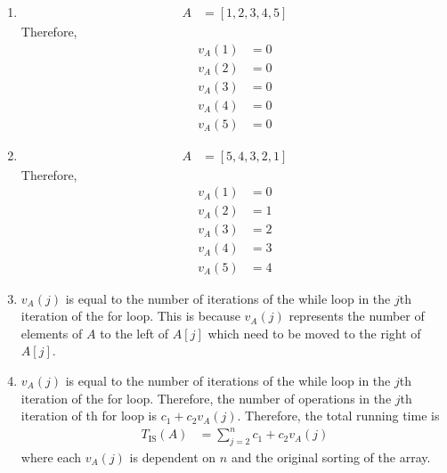 \documentclass[fleqn, a4paper, 11pt, oneside]{amsart}
\theoremstyle{definition}
\theoremstyle{theorem}
\begin{document}
\begin{solution}
	\begin{enumerate}[leftmargin=*]
		\item
			\begin{align*}
				A & = \left[ 1,2,3,4,5 \right]
			\end{align*}
			Therefore,
			\begin{align*}
				v_A(1) & = 0 \\
				v_A(2) & = 0 \\
				v_A(3) & = 0 \\
				v_A(4) & = 0 \\
				v_A(5) & = 0
			\end{align*}
		\item
			\begin{align*}
				A & = \left[ 5,4,3,2,1 \right]
			\end{align*}
			Therefore,
			\begin{align*}
				v_A(1) & = 0 \\
				v_A(2) & = 1 \\
				v_A(3) & = 2 \\
				v_A(4) & = 3 \\
				v_A(5) & = 4
			\end{align*}
		\item
			$v_A(j)$ is equal to the number of iterations of the while loop in the $j$th iteration of the for loop.
			This is because $v_A(j)$ represents the number of elements of $A$ to the left of $A[j]$ which need to be moved to the right of $A[j]$.
		\item
			$v_A(j)$ is equal to the number of iterations of the while loop in the $j$th iteration of the for loop.
			Therefore, the number of operations in the $j$th iteration of th for loop is $c_1 + c_2 v_A(j)$.
			Therefore, the total running time is
			\begin{align*}
				T_{\text{IS}}(A) & = \sum\limits_{j = 2}^{n} c_1 + c_2 v_A(j)
			\end{align*}
			where each $v_A(j)$ is dependent on $n$ and the original sorting of the array.
	\end{enumerate}
\end{solution}
\end{document}
